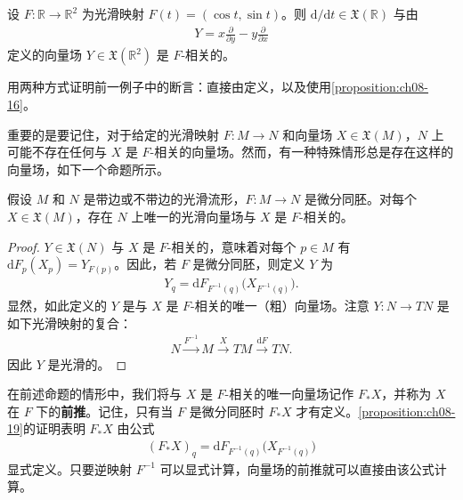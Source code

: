 \documentclass[../../main.tex]{subfiles}
\begin{document}
\begin{example}\label{example:ch08-17}
设 $F\colon\mathbb{R}\to\mathbb{R}^2$ 为光滑映射 $F(t)=(\cos t,\sin t)$。则 $\mathrm{d}/\mathrm{d}t\in\mathfrak{X}(\mathbb{R})$ 与由
\begin{align*}
Y=x\frac{\partial}{\partial y}-y\frac{\partial}{\partial x}
\end{align*}
定义的向量场 $Y\in\mathfrak{X}(\mathbb{R}^2)$ 是 $F$-相关的。
\end{example}

\begin{exercise}\label{exercise:ch08-18}
用两种方式证明前一例子中的断言：直接由定义，以及使用\cref{proposition:ch08-16}。
\end{exercise}

重要的是要记住，对于给定的光滑映射 $F\colon M\to N$ 和向量场 $X\in\mathfrak{X}(M)$，$N$ 上可能不存在任何与 $X$ 是 $F$-相关的向量场。然而，有一种特殊情形总是存在这样的向量场，如下一个命题所示。

\begin{proposition}\label{proposition:ch08-19}
假设 $M$ 和 $N$ 是带边或不带边的光滑流形，$F\colon M\to N$ 是微分同胚。对每个 $X\in\mathfrak{X}(M)$，存在 $N$ 上唯一的光滑向量场与 $X$ 是 $F$-相关的。
\end{proposition}

\begin{proof}
$Y\in\mathfrak{X}(N)$ 与 $X$ 是 $F$-相关的，意味着对每个 $p\in M$ 有 $\mathrm{d}F_p(X_p)=Y_{F(p)}$。因此，若 $F$ 是微分同胚，则定义 $Y$ 为
\begin{align*}
Y_q=\mathrm{d}F_{F^{-1}(q)}\bigl(X_{F^{-1}(q)}\bigr).
\end{align*}
显然，如此定义的 $Y$ 是与 $X$ 是 $F$-相关的唯一（粗）向量场。注意 $Y\colon N\to TN$ 是如下光滑映射的复合：
\begin{align*}
N\xrightarrow{F^{-1}}M\xrightarrow{X}TM\xrightarrow{\mathrm{d}F}TN.
\end{align*}
因此 $Y$ 是光滑的。
\end{proof}

在前述命题的情形中，我们将与 $X$ 是 $F$-相关的唯一向量场记作 $F_*X$，并称为 $X$ 在 $F$ 下的\textbf{前推}。记住，只有当 $F$ 是微分同胚时 $F_*X$ 才有定义。\cref{proposition:ch08-19}的证明表明 $F_*X$ 由公式
\begin{align}
(F_*X)_q=\mathrm{d}F_{F^{-1}(q)}\bigl(X_{F^{-1}(q)}\bigr)\label{align:ch08-07}
\end{align}
显式定义。只要逆映射 $F^{-1}$ 可以显式计算，向量场的前推就可以直接由该公式计算。
\end{document}
